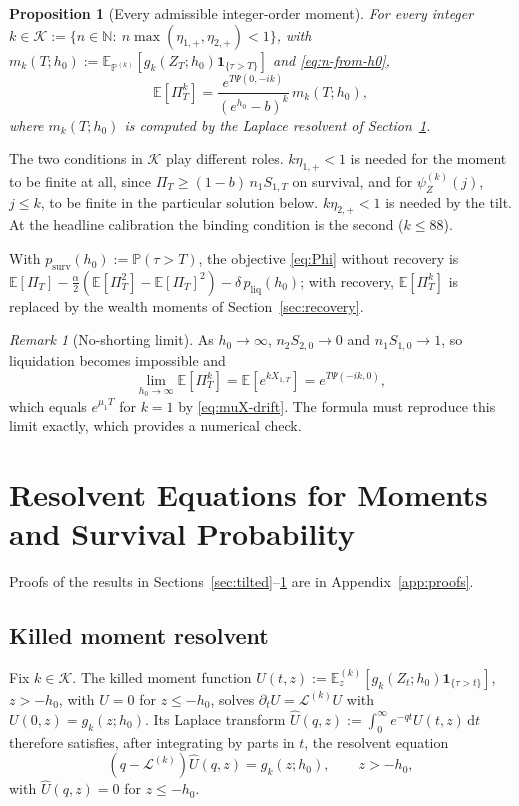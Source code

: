 \documentclass[11pt]{article}
\newcommand{\E}{\mathbb{E}}
\renewcommand{\P}{\mathbb{P}}
\newcommand{\diff}{\mathrm{d}}
\newcommand{\one}{\mathbf{1}}
\theoremstyle{plain}
\newtheorem{proposition}[theorem]{Proposition}
\theoremstyle{definition}
\theoremstyle{remark}
\newtheorem{remark}{Remark}
\begin{document}
\begin{proposition}[Every admissible integer-order moment]\label{prop:integer-moments}
For every integer $k\in\mathcal K:=\{n\in\mathbb N:\ n\max(\eta_{1,+},\eta_{2,+})<1\}$, with
$m_k(T;h_0):=\E_{\P^{(k)}}[g_k(Z_T;h_0)\one_{\{\tau>T\}}]$ and \eqref{eq:n-from-h0},
\[
\E[\Pi_T^k]=\frac{e^{T\Psi(0,-ik)}}{(e^{h_0}-b)^k}\,m_k(T;h_0),
\]
where $m_k(T;h_0)$ is computed by the Laplace resolvent of Section~\ref{sec:resolvent}.
\end{proposition}
The two conditions in $\mathcal K$ play different roles. $k\eta_{1,+}<1$ is needed for the moment to
be finite at all, since $\Pi_T\ge(1-b)\,n_1S_{1,T}$ on survival, and for $\psi_Z^{(k)}(j)$, $j\le k$,
to be finite in the particular solution below. $k\eta_{2,+}<1$ is needed by the tilt. At the
headline calibration the binding condition is the second ($k\le88$).

With $p_{\mathrm{surv}}(h_0):=\P(\tau>T)$, the objective \eqref{eq:Phi} without recovery is
$\E[\Pi_T]-\tfrac{\alpha}{2}(\E[\Pi_T^2]-\E[\Pi_T]^2)-\delta\,p_{\mathrm{liq}}(h_0)$; with recovery,
$\E[\Pi_T^k]$ is replaced by the wealth moments of Section~\ref{sec:recovery}.

\begin{remark}[No-shorting limit]\label{rem:no-shorting}
As $h_0\to\infty$, $n_2S_{2,0}\to0$ and $n_1S_{1,0}\to1$, so liquidation becomes impossible and
\[
\lim_{h_0\to\infty}\E[\Pi_T^k]=\E[e^{kX_{1,T}}]=e^{T\Psi(-ik,0)},
\]
which equals $e^{\mu_1T}$ for $k=1$ by \eqref{eq:muX-drift}. The formula must reproduce this limit
exactly, which provides a numerical check.
\end{remark}

\section{Resolvent Equations for Moments and Survival Probability}\label{sec:resolvent}

Proofs of the results in Sections~\ref{sec:tilted}--\ref{sec:resolvent} are in
Appendix~\ref{app:proofs}.

\subsection{Killed moment resolvent}\label{sec:moment-resolvent}

Fix $k\in\mathcal K$. The killed moment function
$U(t,z) := \E_z^{(k)}[g_k(Z_t;h_0)\one_{\{\tau>t\}}]$, $z>-h_0$, with $U=0$ for $z\le -h_0$, solves
$\partial_t U = \mathcal{L}^{(k)} U$ with $U(0,z) = g_k(z;h_0)$. Its Laplace transform
$\widehat{U}(q,z) := \int_0^\infty e^{-qt}U(t,z)\,\diff t$ therefore satisfies, after integrating
by parts in $t$, the resolvent equation
\begin{equation}\label{eq:resolvent}
(q - \mathcal{L}^{(k)})\widehat{U}(q,z) = g_k(z;h_0), \qquad z > -h_0,
\end{equation}
with $\widehat{U}(q,z)=0$ for $z\le -h_0$.
\end{document}
